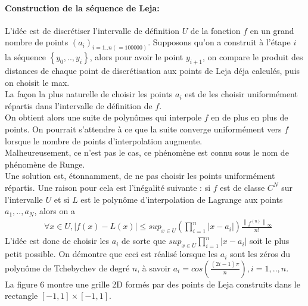 \paragraph{Construction de la séquence de Leja:}
L'idée est de discrétiser l'intervalle de définition $U$ de la fonction $f$ en un grand nombre de points $(a_i)_{i=1..n(=100000)}$.
Supposons qu'on a construit à l'étape $i$ la séquence $\left \{ y_0,..,y_i \right \}$, alors pour avoir le point $y_{i+1}$,
on compare le produit des distances de chaque point de discrétisation aux points de Leja déja calculés, puis on choisit le max.\\
La façon la plus naturelle de choisir les points $a_i$ est de les choisir uniformément répartis dans l'intervalle de définition de $f$.\\
On obtient alors une suite de polynômes qui interpole $f$ en de plus en plus de points. On pourrait s'attendre à ce que la suite converge
uniformément vers $f$ lorsque le nombre de points d'interpolation augmente.\\
Malheureusement, ce n'est pas le cas, ce phénomène est connu sous le nom de phénomène de Runge. \\
Une solution est, étonnamment, de ne pas choisir les points uniformément répartis. Une raison pour cela est l'inégalité suivante :
si $f$ est de classe $C^N$ sur l'intervalle $U$ et si $L$ est le polynôme d'interpolation de Lagrange aux points $a_1,..,a_N$, alors on a
\begin{align}
		& \forall x \in U, \left |f(x)-L(x)\right | \leq sup_{x \in U}  (\prod_{i=1}^n \left | x-a_i \right |) \frac{\left \|f^{(n)} \right \|_{\infty}}{n!}
\end{align}
\hspace{0.5cm}
L'idée est donc de choisir les $a_i$ de sorte que $sup_{x \in U}  \prod_{i=1}^n \left | x-a_i \right |$ soit le plus petit possible. On démontre que
ceci est réalisé lorsque les $a_i$ sont les zéros du polynôme de Tchebychev de degré $n$, à savoir $a_i = cos(\frac{(2i-1) \pi}{n}), i =1,..,n$.\\
La figure 6 montre une grille 2D formés par des points de Leja construits dans le rectangle  $\left [-1,1 \right ] \times \left [-1,1 \right ]$.\\
